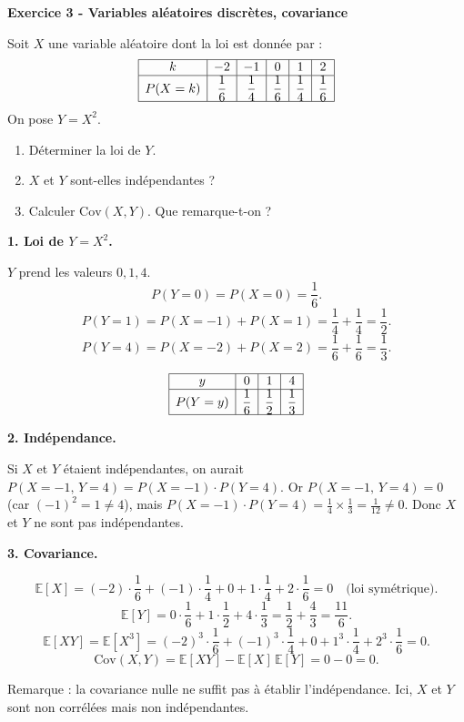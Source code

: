 \documentclass[12pt,a4paper]{article}
\begin{document}
\begin{boiteexercice}
\textbf{Exercice 3 - Variables aléatoires discrètes, covariance}\niveau{\moyen}

Soit $X$ une variable aléatoire dont la loi est donnée par :
\[
\begin{array}{|c|c|c|c|c|c|}
\hline
k & -2 & -1 & 0 & 1 & 2 \\
\hline
P(X=k) & \dfrac{1}{6} & \dfrac{1}{4} & \dfrac{1}{6} & \dfrac{1}{4} & \dfrac{1}{6} \\
\hline
\end{array}
\]
On pose $Y = X^2$.
\begin{enumerate}
  \item Déterminer la loi de $Y$.
  \item $X$ et $Y$ sont-elles indépendantes ?
  \item Calculer $\mathrm{Cov}(X, Y)$. Que remarque-t-on ?
\end{enumerate}
\end{boiteexercice}

\begin{boitecorrige}
\textbf{1. Loi de $Y = X^2$.}

$Y$ prend les valeurs $0, 1, 4$.
\[
P(Y=0) = P(X=0) = \frac{1}{6}.
\]
\[
P(Y=1) = P(X=-1) + P(X=1) = \frac{1}{4} + \frac{1}{4} = \frac{1}{2}.
\]
\[
P(Y=4) = P(X=-2) + P(X=2) = \frac{1}{6} + \frac{1}{6} = \frac{1}{3}.
\]

\[
\begin{array}{|c|c|c|c|}
\hline
y & 0 & 1 & 4 \\
\hline
P(Y=y) & \dfrac{1}{6} & \dfrac{1}{2} & \dfrac{1}{3} \\
\hline
\end{array}
\]

\textbf{2. Indépendance.}

Si $X$ et $Y$ étaient indépendantes, on aurait $P(X=-1,\,Y=4) = P(X=-1)\cdot P(Y=4)$. Or $P(X=-1,\,Y=4) = 0$ (car $(-1)^2 = 1 \neq 4$), mais $P(X=-1)\cdot P(Y=4) = \tfrac{1}{4} \times \tfrac{1}{3} = \tfrac{1}{12} \neq 0$. Donc $X$ et $Y$ ne sont pas indépendantes.

\textbf{3. Covariance.}

\[
\mathbb{E}[X] = (-2)\cdot\frac{1}{6} + (-1)\cdot\frac{1}{4} + 0 + 1\cdot\frac{1}{4} + 2\cdot\frac{1}{6} = 0 \quad \text{(loi symétrique).}
\]
\[
\mathbb{E}[Y] = 0 \cdot \frac{1}{6} + 1 \cdot \frac{1}{2} + 4 \cdot \frac{1}{3} = \frac{1}{2} + \frac{4}{3} = \frac{11}{6}.
\]
\[
\mathbb{E}[XY] = \mathbb{E}[X^3] = (-2)^3 \cdot \frac{1}{6} + (-1)^3 \cdot \frac{1}{4} + 0 + 1^3 \cdot \frac{1}{4} + 2^3 \cdot \frac{1}{6} = 0.
\]
\[
\mathrm{Cov}(X,Y) = \mathbb{E}[XY] - \mathbb{E}[X]\,\mathbb{E}[Y] = 0 - 0 = 0.
\]

Remarque : la covariance nulle ne suffit pas à établir l'indépendance. Ici, $X$ et $Y$ sont non corrélées mais non indépendantes.
\end{boitecorrige}
\end{document}
